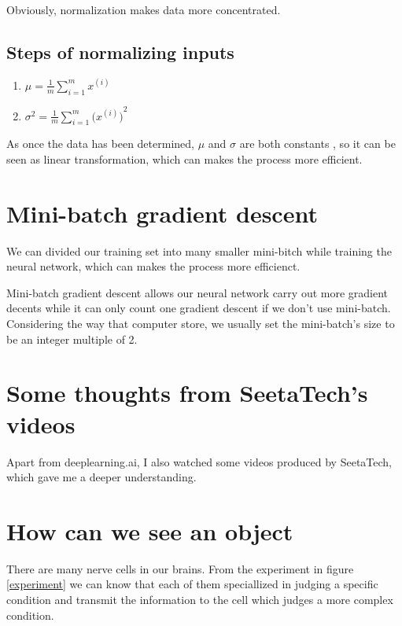 \documentclass{article}
\begin{document}
Obviously, normalization makes data more concentrated.
\subsection{Steps of normalizing inputs}
\begin{enumerate}

\item $\mu = \frac{1}{m}\sum\limits_{i =1}^{m}x^{(i)}$
\item $\sigma^{2}= \frac{1}{m}\sum\limits_{i =1}^{m}{({x^{(i)})}^{2}}$

\end{enumerate}

As once the data has been determined, $\mu$ and $\sigma$ are both constants , so it can be seen as linear transformation, which can makes the process more efficient.

\section{Mini-batch gradient descent}
We can divided our training set into many smaller mini-bitch while training the neural network, which can makes the process more efficienct.\par
Mini-batch gradient descent allows our neural network carry out more gradient decents while it can only count one gradient descent if we don't use mini-batch. Considering the way that computer store, we usually set the  mini-batch's size to be an integer multiple of 2. 



\section*{Some thoughts from SeetaTech's videos}
Apart from deeplearning.ai, I also watched some videos produced by SeetaTech, which gave me a deeper understanding.
\setcounter{section}{0}
\section{How can we see an object}
There are many nerve cells in our brains. From the experiment in figure  \ref{experiment} we can know that each of them speciallized in judging a specific condition and transmit the information to the cell which judges a more complex condition.
 
\end{document}

